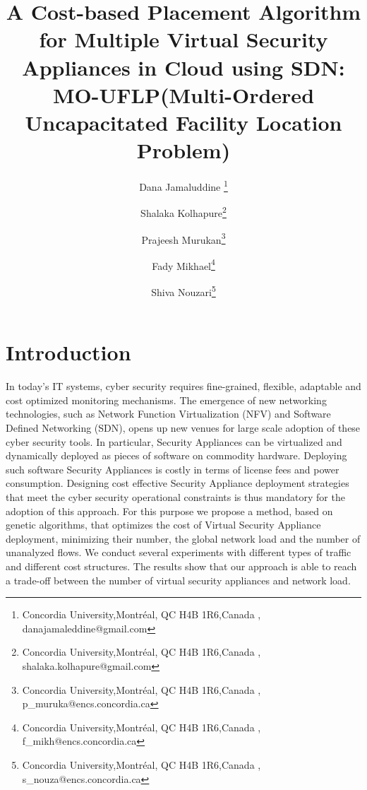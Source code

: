 \documentclass{article}
\title{A Cost-based Placement Algorithm for Multiple Virtual Security Appliances in Cloud using SDN: MO-UFLP(Multi-Ordered Uncapacitated Facility Location Problem)}
\author{
	Dana Jamaluddine \thanks{Concordia University,Montréal, QC H4B 1R6,Canada , danajamaleddine@gmail.com}
	\and
	Shalaka Kolhapure\thanks{Concordia University,Montréal, QC H4B 1R6,Canada , shalaka.kolhapure@gmail.com}
	\and
	Prajeesh Murukan\thanks{Concordia University,Montréal, QC H4B 1R6,Canada , p\_muruka@encs.concordia.ca}
	\and
	Fady Mikhael\thanks{Concordia University,Montréal, QC H4B 1R6,Canada , f\_mikh@encs.concordia.ca}
	\and
	Shiva Nouzari\thanks{Concordia University,Montréal, QC H4B 1R6,Canada , s\_nouza@encs.concordia.ca}
}
\date{}
\begin{document}
\maketitle


\pagebreak
\tableofcontents

\pagebreak
\listoffigures

\pagebreak
\listoftables

\pagebreak

\section{Introduction}
\label{introduction}

In today’s IT systems, cyber security requires fine-grained, flexible, adaptable and cost optimized monitoring mechanisms. The emergence of new networking technologies, such as Network Function Virtualization (NFV) and Software Defined Networking (SDN), opens up new venues for large scale adoption of these cyber security tools. In particular, Security Appliances can be virtualized and dynamically deployed as pieces of software on commodity hardware. Deploying such software Security Appliances is costly in terms of license fees and power consumption. Designing cost effective Security Appliance deployment strategies that meet the cyber security operational constraints is thus mandatory for the adoption of this approach. For this purpose we propose a method, based on genetic algorithms, that optimizes the cost of Virtual Security Appliance deployment, minimizing their number, the global network load and the number of unanalyzed flows. We conduct several experiments with different types of traffic and different cost structures. The results show that our approach is able to reach a trade-off between the number of virtual security appliances and network load.
\end{document}
